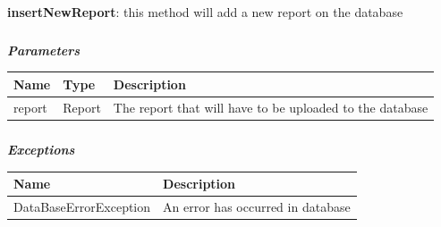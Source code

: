 						\paragraph{}
							\textbf{insertNewReport}: this method will add a new report on the database
							\subparagraph{}
							\textit{\textbf{Parameters}}
							\vspace{-2mm}
								\begin{table}[!h]
									\begin{tabular}{L{0.15\textwidth}L{0.15\textwidth}L{0.5\textwidth}}
										\toprule
										\textbf{Name} & \textbf{Type} & \textbf{Description} \\
										\midrule
								  		report & Report & The report that will have to be uploaded to the database \\
								 		\bottomrule
									\end{tabular}
								\end{table}
							\vspace{-6mm}
							\subparagraph{}
							\textit{\textbf{Exceptions}}
							\vspace{-2mm}
								\begin{table}[!h]
									\begin{tabular}{L{0.35\textwidth}L{0.45\textwidth}}
										\toprule
										\textbf{Name} & \textbf{Description} \\
										\midrule
								  		DataBaseErrorException & An error has occurred in database \\
								 		\bottomrule
									\end{tabular}
								\end{table}
						\clearpage
